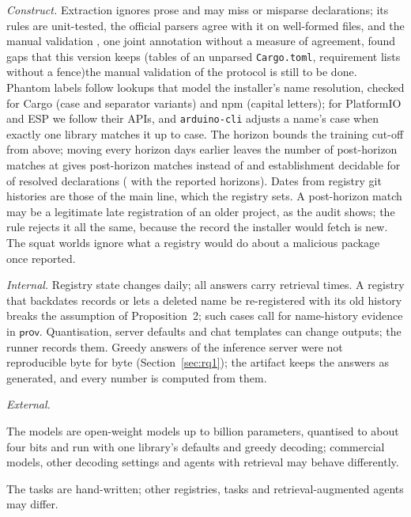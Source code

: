 \documentclass[conference]{IEEEtran}
\newif\ifpilot     \pilotfalse      %
\newcommand{\sprov}{\mathsf{prov}}
\begin{document}
\emph{Construct.} Extraction ignores prose and may miss or misparse declarations; its rules are unit-tested, the
official parsers agree with it on well-formed files, and \ifnum{} the manual validation\ifnum
{}, one joint annotation without a measure of agreement,\fi{} found gaps that this version keeps (tables of an
unparsed \texttt{Cargo.toml}, requirement lists without a fence)\else the manual validation of the protocol is still
to be done\fi.
Phantom labels follow lookups that model the installer's name resolution, checked for Cargo (case and separator
variants) and npm (capital letters); for PlatformIO and ESP we follow their APIs, and \texttt{arduino-cli} adjusts a
name's case when exactly one library matches it up to case. The
horizon bounds the training cut-off from above; moving every horizon \rHorizonShiftDays{} days earlier
\ifnum{} leaves the number of post-horizon matches at \rNPostHorizon\else gives
\rNPostHorizonShift{} post-horizon matches instead of \rNPostHorizon\fi{} and establishment decidable for
\rEstDecidedShift{} of resolved declarations (\rEstDecided{} with the reported horizons). Dates from registry git
histories are those of the main line, which the registry sets. A post-horizon match may be a legitimate late
registration of an older project, as the audit shows; the rule rejects it all the same, because the record the
installer would fetch is new. The squat worlds ignore what a registry would do about a malicious package once reported.

\emph{Internal.} Registry state changes daily; all answers carry retrieval times. A registry that backdates records or
lets a deleted name be re-registered with its old history breaks the assumption of Proposition~2; such cases call for
name-history evidence in $\sprov$. Quantisation, server defaults and chat templates can change outputs; the runner
records them\ifpilot, and DeepSeek-Coder, whose file carries no template, is served in its own prompt format.\else.
Greedy answers of the inference server were not reproducible byte for byte (Section~\ref{sec:rq1}); the artifact keeps
the answers as generated, and every number is computed from them.\fi

\emph{External.}
\ifpilot
The reported configuration is a pilot: \rNModels{} models of \rRunMinParams--\rRunMaxParams B parameters with greedy
decoding on a CPU host, three of them with small token budgets. The rates here are not estimates for the model
population; they validate the harness and show how answer quality moves them.
\else
The models are open-weight models up to \rStudyMaxParams{} billion parameters, quantised to about four bits and
run with one library's defaults and greedy decoding; commercial models, other decoding settings and agents with
retrieval may behave differently.
\fi
The \rNTasks{} tasks are hand-written; other registries, tasks and retrieval-augmented agents may differ.
\end{document}
